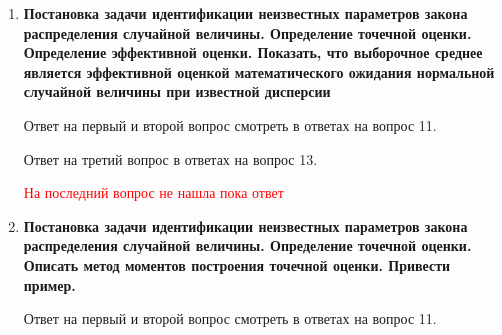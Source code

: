 \documentclass[12pt]{report}
\begin{document}
\begin{enumerate}
	\begin{figure}[!h]
	\end{figure}
	
	\item \textbf{Постановка задачи идентификации неизвестных параметров закона распределения случайной величины. Определение точечной оценки. Определение эффективной оценки. Показать, что
		выборочное среднее является эффективной оценкой математического ожидания нормальной
		случайной величины при известной дисперсии}
	
	Ответ на первый и второй вопрос смотреть в ответах на вопрос 11.
	
	Ответ на третий вопрос в ответах на вопрос 13.
	
	\textcolor{red}{На последний вопрос не нашла пока ответ}
	
	\clearpage
	
	\item \textbf{Постановка задачи идентификации неизвестных параметров закона распределения случайной величины. Определение точечной оценки. Описать метод моментов построения точечной
		оценки. Привести пример.}
	
	Ответ на первый и второй вопрос смотреть в ответах на вопрос 11.
	

\end{enumerate}
\end{document}
